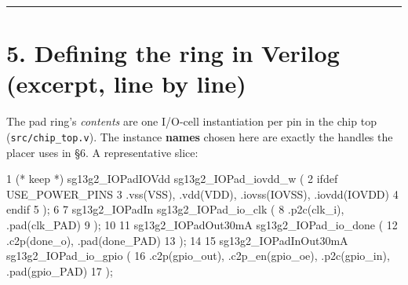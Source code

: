 \documentclass[
  11pt,
  a4paper,
]{article}
\newenvironment{Shaded}{}{}
\newcommand{\DecValTok}[1]{\textcolor[rgb]{0.25,0.63,0.44}{#1}}
\newcommand{\NormalTok}[1]{#1}
\newcommand{\OperatorTok}[1]{\textcolor[rgb]{0.40,0.40,0.40}{#1}}
\newcommand{\OtherTok}[1]{\textcolor[rgb]{0.00,0.44,0.13}{#1}}
\begin{document}
\begin{center}\rule{0.5\linewidth}{0.5pt}\end{center}

\hypertarget{defining-the-ring-in-verilog-excerpt-line-by-line}{%
\section{5. Defining the ring in Verilog (excerpt, line by
line)}\label{defining-the-ring-in-verilog-excerpt-line-by-line}}

The pad ring's \emph{contents} are one I/O-cell instantiation per pin in
the chip top (\texttt{src/chip\_top.v}). The instance \textbf{names}
chosen here are exactly the handles the placer uses in §6. A
representative slice:

\begin{Shaded}
\begin{Highlighting}[]
 \DecValTok{1}  \OperatorTok{(}\NormalTok{* keep *}\OperatorTok{)}\NormalTok{ sg13g2\_IOPadIOVdd sg13g2\_IOPad\_iovdd\_w }\OperatorTok{(}
 \DecValTok{2}  \OtherTok{\textasciigrave{}ifdef}\NormalTok{ USE\_POWER\_PINS}
 \DecValTok{3}\NormalTok{      .vss}\OperatorTok{(}\NormalTok{VSS}\OperatorTok{),}\NormalTok{ .vdd}\OperatorTok{(}\NormalTok{VDD}\OperatorTok{),}\NormalTok{ .iovss}\OperatorTok{(}\NormalTok{IOVSS}\OperatorTok{),}\NormalTok{ .iovdd}\OperatorTok{(}\NormalTok{IOVDD}\OperatorTok{)}
 \DecValTok{4}  \OtherTok{\textasciigrave{}endif}
 \DecValTok{5}  \OperatorTok{);}
 \DecValTok{6}
 \DecValTok{7}\NormalTok{  sg13g2\_IOPadIn sg13g2\_IOPad\_io\_clk }\OperatorTok{(}
 \DecValTok{8}\NormalTok{      .p2c}\OperatorTok{(}\NormalTok{clk\_i}\OperatorTok{),}\NormalTok{ .pad}\OperatorTok{(}\NormalTok{clk\_PAD}\OperatorTok{)}
 \DecValTok{9}  \OperatorTok{);}
\DecValTok{10}
\DecValTok{11}\NormalTok{  sg13g2\_IOPadOut30mA sg13g2\_IOPad\_io\_done }\OperatorTok{(}
\DecValTok{12}\NormalTok{      .c2p}\OperatorTok{(}\NormalTok{done\_o}\OperatorTok{),}\NormalTok{ .pad}\OperatorTok{(}\NormalTok{done\_PAD}\OperatorTok{)}
\DecValTok{13}  \OperatorTok{);}
\DecValTok{14}
\DecValTok{15}\NormalTok{  sg13g2\_IOPadInOut30mA sg13g2\_IOPad\_io\_gpio }\OperatorTok{(}
\DecValTok{16}\NormalTok{      .c2p}\OperatorTok{(}\NormalTok{gpio\_out}\OperatorTok{),}\NormalTok{ .c2p\_en}\OperatorTok{(}\NormalTok{gpio\_oe}\OperatorTok{),}\NormalTok{ .p2c}\OperatorTok{(}\NormalTok{gpio\_in}\OperatorTok{),}\NormalTok{ .pad}\OperatorTok{(}\NormalTok{gpio\_PAD}\OperatorTok{)}
\DecValTok{17}  \OperatorTok{);}
\end{Highlighting}
\end{Shaded}
\end{document}
